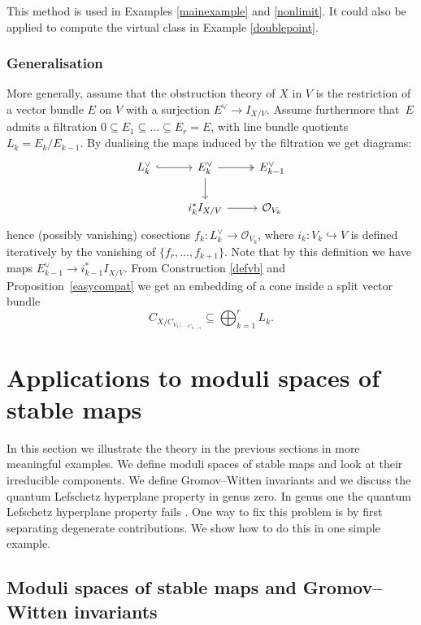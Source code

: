 \documentclass[pdftex]{sigma}
\numberwithin{equation}{section}
\newcommand{\OO}{\mathcal{O}}
\begin{document}
This method is used in Examples \ref{mainexample} and \ref{nonlimit}. It could also be applied to compute the virtual class in Example \ref{doublepoint}.
\subsubsection{Generalisation}
More generally, assume that the obstruction theory of $X$ in $V$ is the restriction of a vector bundle $E$ on $V$ with a surjection $E^\vee\to I_{X/V}$. Assume furthermore that~$E$ admits a filtration $0\subseteq E_1\subseteq\dots \subseteq E_r=E$, with line bundle quotients $L_k=E_k/E_{k-1}$. By dualising the maps induced by the filtration we get diagrams:
\[\begin{tikzcd}
L_k^\vee \ar[r,hook] & E_k^\vee \ar[r,two heads]\ar[d] & E_{k-1}^\vee \\
& i_k^*I_{X/V}\ar[r] & \OO_{V_k}
\end{tikzcd}
\]
hence (possibly vanishing) cosections $f_k\colon L_k^\vee\to \OO_{V_k}$, where $i_k\colon V_k\hookrightarrow V$ is defined iteratively by the vanishing of $\{f_r,\ldots,f_{k+1}\}$. Note that by this definition we have maps $E_{k-1}^\vee\to i_{k-1}^*I_{X/V}$. From Construction \ref{defvb} and Proposition~\ref{easycompat} we get an embedding of a cone inside a split vector bundle \[C_{X/C_{V_1/\ldots_{/C_{V_{r-1}/V}}}}\subseteq \bigoplus_{k=1}^r L_k.\]

\section{Applications to moduli spaces of stable maps}\label{applications}
In this section we illustrate the theory in the previous sections in more meaningful examples. We define moduli spaces of stable maps and look at their irreducible components. We define Gromov--Witten invariants and we discuss the quantum Lefschetz hyperplane property in genus zero. In genus one the quantum Lefschetz hyperplane property fails \cite{coates2012}. One way to fix this problem is by first separating degenerate contributions. We show how to do this in one simple example.

\subsection{Moduli spaces of stable maps and Gromov--Witten invariants}
\end{document}
